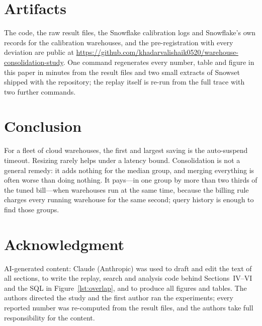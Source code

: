 \documentclass[conference]{IEEEtran}
\begin{document}
\section{Artifacts}\label{sec:artifacts}
The code, the raw result files, the Snowflake calibration logs and Snowflake's own records for the calibration warehouses,
and the pre-registration with every deviation are public at
\url{https://github.com/khadarvalishaik0520/warehouse-consolidation-study}. One command regenerates every number, table and figure in this paper in minutes from the result files and two small
extracts of Snowset shipped with the repository; the replay itself is re-run from the full trace with two further
commands.

\section{Conclusion}
For a fleet of cloud warehouses, the first and largest saving is the auto-suspend timeout. Resizing rarely helps under a
latency bound. Consolidation is not a general remedy: it adds nothing for the median group, and merging everything is often
worse than doing nothing. It pays---in one group by more than two thirds of the tuned bill---when warehouses run at the same
time, because the billing rule charges every running warehouse for the same second; query history is enough to find those
groups.

\section*{Acknowledgment}
AI-generated content: Claude (Anthropic) was used to draft and edit the text of all sections, to write the replay, search
and analysis code behind Sections~IV--VI and the SQL in Figure~\ref{lst:overlap}, and to produce all figures and tables. The authors directed the study and the first author ran the
experiments; every reported number was re-computed from the result files, and the authors take full responsibility for
the content.



\end{document}
